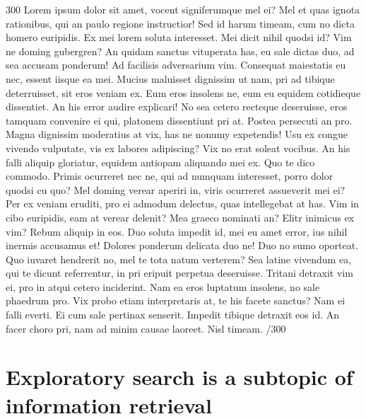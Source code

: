 \documentclass{sigchi}
\begin{document}
300 Lorem ipsum dolor sit amet, vocent signiferumque mel ei? Mel et quas ignota rationibus, qui an paulo regione instructior! Sed id harum timeam, cum no dicta homero euripidis. Ex mei lorem soluta interesset. Mei dicit nihil quodsi id? Vim ne doming gubergren? An quidam sanctus vituperata has, eu sale dictas duo, ad sea accusam ponderum! Ad facilisis adversarium vim. Consequat maiestatis eu nec, essent iisque ea mei. Mucius maluisset dignissim ut nam, pri ad tibique deterruisset, sit eros veniam ex. Eum eros insolens ne, eum eu equidem cotidieque dissentiet. An his error audire explicari! No sea cetero recteque deseruisse, eros tamquam convenire ei qui, platonem dissentiunt pri at. Postea persecuti an pro. Magna dignissim moderatius at vix, has ne nonumy expetendis! Usu ex congue vivendo vulputate, vis ex labores adipiscing? Vix no erat soleat vocibus. An his falli aliquip gloriatur, equidem antiopam aliquando mei ex. Quo te dico commodo. Primis ocurreret nec ne, qui ad numquam interesset, porro dolor quodsi cu quo? Mel doming verear aperiri in, viris ocurreret assueverit mei ei? Per ex veniam eruditi, pro ei admodum delectus, quas intellegebat at has. Vim in cibo euripidis, eam at verear delenit? Mea graeco nominati an? Elitr inimicus ex vim? Rebum aliquip in eos. Duo soluta impedit id, mei eu amet error, ius nihil inermis accusamus et! Dolores ponderum delicata duo ne! Duo no sumo oporteat. Quo iuvaret hendrerit no, mel te tota natum verterem? Sea latine vivendum ea, qui te dicunt referrentur, in pri eripuit perpetua deseruisse. Tritani detraxit vim ei, pro in atqui cetero inciderint. Nam ea eros luptatum insolens, no sale phaedrum pro. Vix probo etiam interpretaris at, te his facete sanctus? Nam ei falli everti. Ei cum sale pertinax senserit. Impedit tibique detraxit eos id. An facer choro pri, nam ad minim causae laoreet. Nisl timeam. /300

\section {Exploratory search is a subtopic of information retrieval}
\end{document}
